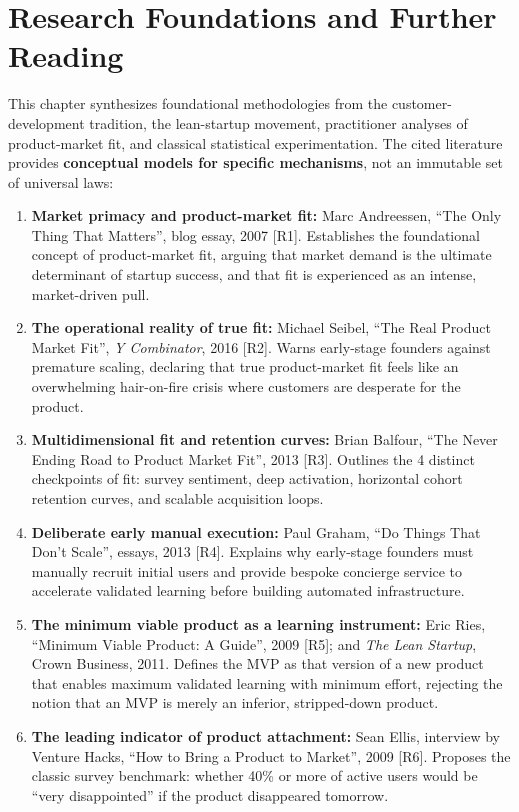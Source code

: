 \section*{Research Foundations and Further Reading}

This chapter synthesizes foundational methodologies from the customer-development tradition, the lean-startup movement, practitioner analyses of product-market fit, and classical statistical experimentation. The cited literature provides \textbf{conceptual models for specific mechanisms}, not an immutable set of universal laws:

\begin{enumerate}
    \item \textbf{Market primacy and product-market fit:} Marc Andreessen, ``The Only Thing That Matters'', blog essay, 2007 [R1]. Establishes the foundational concept of product-market fit, arguing that market demand is the ultimate determinant of startup success, and that fit is experienced as an intense, market-driven pull.
    \item \textbf{The operational reality of true fit:} Michael Seibel, ``The Real Product Market Fit'', \emph{Y Combinator}, 2016 [R2]. Warns early-stage founders against premature scaling, declaring that true product-market fit feels like an overwhelming hair-on-fire crisis where customers are desperate for the product.
    \item \textbf{Multidimensional fit and retention curves:} Brian Balfour, ``The Never Ending Road to Product Market Fit'', 2013 [R3]. Outlines the 4 distinct checkpoints of fit: survey sentiment, deep activation, horizontal cohort retention curves, and scalable acquisition loops.
    \item \textbf{Deliberate early manual execution:} Paul Graham, ``Do Things That Don't Scale'', essays, 2013 [R4]. Explains why early-stage founders must manually recruit initial users and provide bespoke concierge service to accelerate validated learning before building automated infrastructure.
    \item \textbf{The minimum viable product as a learning instrument:} Eric Ries, ``Minimum Viable Product: A Guide'', 2009 [R5]; and \emph{The Lean Startup}, Crown Business, 2011. Defines the MVP as that version of a new product that enables maximum validated learning with minimum effort, rejecting the notion that an MVP is merely an inferior, stripped-down product.
    \item \textbf{The leading indicator of product attachment:} Sean Ellis, interview by Venture Hacks, ``How to Bring a Product to Market'', 2009 [R6]. Proposes the classic survey benchmark: whether 40\% or more of active users would be ``very disappointed'' if the product disappeared tomorrow.

\end{enumerate}
